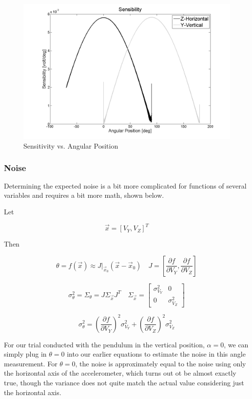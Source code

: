 \documentclass{article}
\theoremstyle{plain}
\theoremstyle{definition}
\theoremstyle{remark}
\begin{document}
\begin{figure}[hbt]
\begin{center}
\includegraphics[width = 13cm]{Dual_Sensibility.png}
\caption{Sensitivity vs. Angular Position}
\label{Dual_Sensibility}
\end{center}
\end{figure}

\clearpage
\subsubsection{Noise}

Determining the expected noise is a bit more complicated for functions of several variables and requires a bit more math, shown below.   

Let 

$$ \vec{x} = \left[ V_Y, V_Z \right]^T $$

Then

$$ \theta = f(\vec{x}) \approx J|_{\vec{x}_0} \left( \vec{x} - \vec{x}_{0}\right) \quad J = \left[ \frac{\partial f}{\partial V_{Y}}, \frac{\partial f }{\partial V_Z} \right] $$

$$ \sigma^2_{\theta} = \Sigma_{\theta} = J \Sigma_{\vec{x}} J^T  \quad 
\Sigma_{\vec{x}} = \left[
\begin{matrix}
\sigma^2_{V_{Y}}  & 0 \\
0 & \sigma^2_{V_{Z}} 
\end{matrix} \right]$$

$$ \sigma^2_{\theta} = \left(\frac{\partial f}{\partial V_{Y}}\right)^2 \sigma^2_{V_{Y}} + \left(\frac{\partial f }{\partial V_Z} \right)^2 \sigma^2_{V_{Z}} $$

For our trial conducted with the pendulum in the vertical position, $\alpha = 0$, we can simply plug in $\theta = 0$ into our earlier equations to estimate the noise in this angle measurement.  For $\theta = 0$, the noise is approximately equal to the noise using only the horizontal axis of the accelerometer, which turns out ot be almost exactly true, though the variance does not quite match the actual value considering just the horizontal axis.
\end{document}
